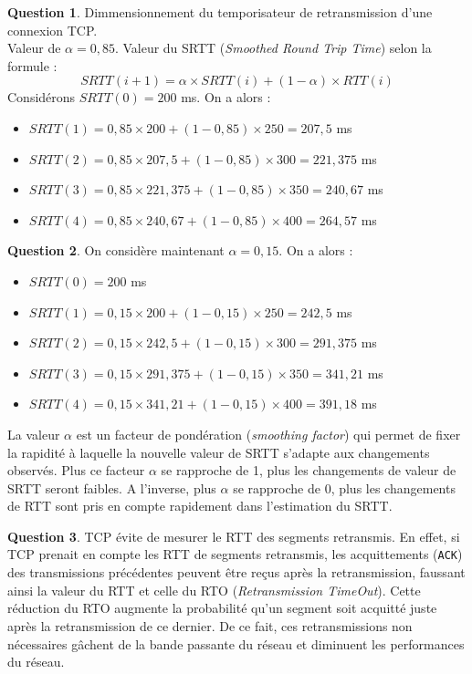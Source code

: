 \documentclass[11pt,english,french]{scrreprt}
\theoremstyle{remark}
\theoremstyle{definition}
\newtheorem{ques}{Question}[section]
\begin{document}
\begin{ques}
	Dimmensionnement du temporisateur de retransmission d'une connexion TCP.\\
	Valeur de $\alpha = 0,85$. Valeur du SRTT (\emph{Smoothed Round Trip Time}) selon la formule : 
	\[SRTT(i+1) = \alpha\times SRTT(i) + (1-\alpha)\times RTT(i)\]
	Considérons $SRTT(0) = 200$ ms. On a alors : \begin{itemize}
		\item $SRTT(1) = 0,85\times 200 + (1-0,85)\times 250=207,5$ ms
		\item $SRTT(2) = 0,85\times 207,5 + (1-0,85)\times 300=221,375$ ms
		\item $SRTT(3) = 0,85\times 221,375 + (1-0,85)\times 350=240,67$ ms
		\item $SRTT(4) = 0,85\times 240,67 + (1-0,85)\times 400=264,57$ ms
	\end{itemize}
\end{ques}

\begin{ques}
	On considère maintenant $\alpha = 0,15$. On a alors :\begin{itemize}
		\item $SRTT(0) = 200$ ms
		\item $SRTT(1) = 0,15\times 200 + (1-0,15)\times 250=242,5$ ms
		\item $SRTT(2) = 0,15\times 242,5 + (1-0,15)\times 300=291,375$ ms
		\item $SRTT(3) = 0,15\times 291,375 + (1-0,15)\times 350=341,21$ ms
		\item $SRTT(4) = 0,15\times 341,21 + (1-0,15)\times 400=391,18$ ms
	\end{itemize}
	
	La valeur $\alpha$ est un facteur de pondération (\emph{smoothing factor}) qui permet de fixer la rapidité à laquelle la nouvelle valeur de SRTT s'adapte aux changements observés. Plus ce facteur $\alpha$ se rapproche de 1, plus les changements de valeur de SRTT seront faibles. A l'inverse, plus $\alpha$ se rapproche de 0, plus les changements de RTT sont pris en compte rapidement dans l'estimation du SRTT.
\end{ques}

\begin{ques}
	TCP évite de mesurer le RTT des segments retransmis. En effet, si TCP prenait en compte les RTT de segments retransmis, les acquittements (\lstinline!ACK!) des transmissions précédentes peuvent être reçus après la retransmission, faussant ainsi la valeur du RTT et celle du RTO (\emph{Retransmission TimeOut}). Cette réduction du RTO augmente la probabilité qu'un segment soit acquitté juste après la retransmission de ce dernier. De ce fait, ces retransmissions non nécessaires gâchent de la bande passante du réseau et diminuent les performances du réseau.
\end{ques}
\end{document}
